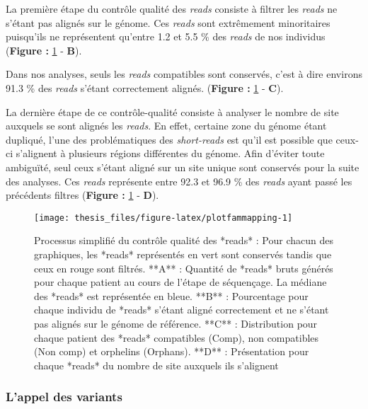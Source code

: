 \documentclass[12pt,twoside]{reedthesis}
\theoremstyle{definition}
\theoremstyle{definition}
\theoremstyle{remark}
\begin{document}
  La première étape du contrôle qualité des \emph{reads} consiste à
  filtrer les \emph{reads} ne s'étant pas alignés sur le génome. Ces
  \emph{reads} sont extrêmement minoritaires puisqu'ils ne représentent
  qu'entre 1.2 et 5.5 \% des \emph{reads} de nos individus (\textbf{Figure
  : }\ref{fig:plotfammapping} - \textbf{B}).
  
  Dans nos analyses, seuls les \emph{reads} compatibles sont conservés,
  c'est à dire environs 91.3 \% des \emph{reads} s'étant correctement
  alignés. (\textbf{Figure : }\ref{fig:plotfammapping} - \textbf{C}).
  
  La dernière étape de ce contrôle-qualité consiste à analyser le nombre
  de site auxquels se sont alignés les \emph{reads}. En effet, certaine
  zone du génome étant dupliqué, l'une des problématiques des
  \emph{short-reads} est qu'il est possible que ceux-ci s'alignent à
  plusieurs régions différentes du génome. Afin d'éviter toute ambiguïté,
  seul ceux s'étant aligné sur un site unique sont conservés pour la suite
  des analyses. Ces \emph{reads} représente entre 92.3 et 96.9 \% des
  \emph{reads} ayant passé les précédents filtres (\textbf{Figure :
  }\ref{fig:plotfammapping} - \textbf{D}).
  
  \newpage 
  
  \begin{figure}
  
  {\centering \texttt{[image: thesis\_files/figure-latex/plotfammapping-1]} 
  
  }
  
  \caption[Processus simplifié du contrôle qualité des *reads*]{Processus simplifié du contrôle qualité des *reads* : Pour chacun des graphiques, les *reads* représentés en vert sont conservés tandis que ceux en rouge sont filtrés. **A** : Quantité de *reads* bruts générés pour chaque patient au cours de l'étape de séquençage. La médiane des *reads* est représentée en bleue. **B** : Pourcentage pour chaque individu de *reads* s'étant aligné correctement et ne s'étant pas alignés sur le génome de référence. **C** : Distribution pour chaque patient des *reads* compatibles (Comp), non compatibles (Non comp) et orphelins (Orphans). **D** : Présentation pour chaque *reads* du nombre de site auxquels ils s'alignent}\label{fig:plotfammapping}
  \end{figure}
  
  \newpage  
  
  \subsubsection{L'appel des variants}\label{lappel-des-variants-1}
  
\end{document}

